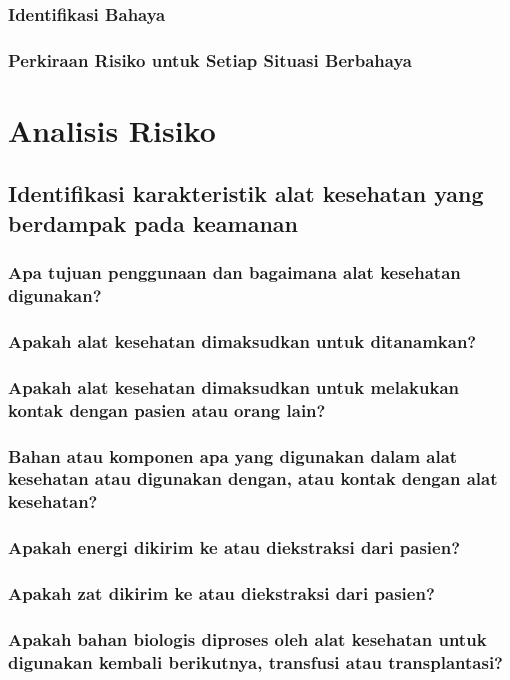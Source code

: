 \documentclass[11pt,a4paper,twoside,draft,onecolumn]{book}
\begin{document}
			\subsection{Identifikasi Bahaya}
			\subsection{Perkiraan Risiko untuk Setiap Situasi Berbahaya}
	\newpage
	
	\chapter{Analisis Risiko}
		\section{Identifikasi karakteristik alat kesehatan yang berdampak pada keamanan}
			\subsection{Apa tujuan penggunaan dan bagaimana alat kesehatan digunakan?}
			\subsection{Apakah alat kesehatan dimaksudkan untuk ditanamkan?}
			\subsection{Apakah alat kesehatan dimaksudkan untuk melakukan kontak dengan pasien atau orang lain?}
			\subsection{Bahan atau komponen apa yang digunakan dalam alat kesehatan atau digunakan dengan, atau kontak dengan alat kesehatan?}
			\subsection{Apakah energi dikirim ke atau diekstraksi dari pasien?}
			\subsection{Apakah zat dikirim ke atau diekstraksi dari pasien?}
			\subsection{Apakah bahan biologis diproses oleh alat kesehatan untuk digunakan kembali berikutnya, transfusi atau transplantasi?}
\end{document}
